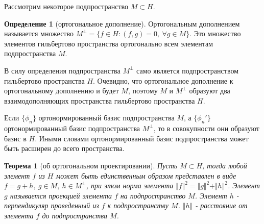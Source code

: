 \documentclass[14pt,a4paper]{extarticle}
\newtheorem{theorem}{Теорема}[section]
\theoremstyle{definition}
\newtheorem{definition}{Определение}[section]
\theoremstyle{remark}
\renewcommand{\[}{\begin{dmath*}[compact]}
\renewcommand{\]}{\end{dmath*}}
\newcommand{\sep}{ , \ \allowbreak }
\begin{document}
Рассмотрим некоторое подпространство $M \subset H$.

\begin{definition}[ортогональное дополнение]
  Ортогональным дополнением называется множество
  $M^\bot = \{f \in H: (f,g) = 0 \sep \forall g \in M\}$.
  Это множество элементов гильбертово пространства ортогонально всем
  элементам подпространства $M$.
\end{definition}

В силу определения подпространства $M^\bot$ само является подпространством
гильбертово пространства $H$.
Очевидно, что ортогональное дополнение к ортогональному дополнению и будет $M$,
поэтому $M$ и $M^\bot$ образуют два взаимодополняющих пространства
гильбертово пространства $H$.

Если $\{\phi_n\}$ ортонормированный базис подпространства $M$, а $\{\phi_n'\}$
ортонормированный базис подпространства $M^\bot$, то в совокупности они образуют
базис в $H$.
Иными словами ортонормированный базис подпространства может быть
расширен до всего пространства.

\begin{theorem}[об ортогональном проектировании]
\label{th:об ортогональном проектировании}
  Пусть $M \subset H$, тогда любой элемент $f$ из $H$ может быть
  единственным образом представлен в виде
  $f = g+h \sep g \in M \sep h \in M^\bot$,
  при этом норма элемента $\Vert f \Vert^2 = \Vert g \Vert^2 + \Vert h \Vert^2$.
  Элемент $g$ называется проекцией элемента $f$ на подпространство $M$.
  Элемент $h$ - перпендикуляр проведенный из $f$ к подпространству $M$.
  $\Vert h \Vert$ - расстояние от элемента $f$ до подпространства $M$.
\end{theorem}
\end{document}
